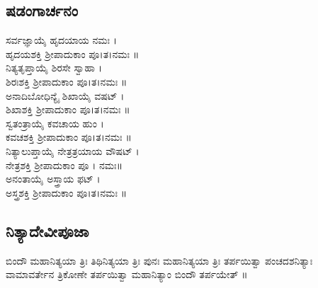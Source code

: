 \subsection{ಷಡಂಗಾರ್ಚನಂ}
 ಸರ್ವಜ್ಞಾಯೈ ಹೃದಯಾಯ ನಮಃ ।\\ ಹೃದಯಶಕ್ತಿ ಶ್ರೀಪಾದುಕಾಂ ಪೂ।ತ।ನಮಃ ॥\\
 ನಿತ್ಯತೃಪ್ತಾಯೈ ಶಿರಸೇ ಸ್ವಾಹಾ ।\\ ಶಿರಃಶಕ್ತಿ ಶ್ರೀಪಾದುಕಾಂ ಪೂ।ತ।ನಮಃ ॥\\
 ಅನಾದಿಬೋಧಿನ್ಯೈ ಶಿಖಾಯೈ ವಷಟ್ ।\\ ಶಿಖಾಶಕ್ತಿ ಶ್ರೀಪಾದುಕಾಂ ಪೂ।ತ।ನಮಃ ॥\\
 ಸ್ವತಂತ್ರಾಯೈ ಕವಚಾಯ ಹುಂ ।\\ ಕವಚಶಕ್ತಿ ಶ್ರೀಪಾದುಕಾಂ ಪೂ।ತ।ನಮಃ ॥\\
 ನಿತ್ಯಾಲುಪ್ತಾಯೈ ನೇತ್ರತ್ರಯಾಯ ವೌಷಟ್ ।\\ ನೇತ್ರಶಕ್ತಿ ಶ್ರೀಪಾದುಕಾಂ ಪೂ । ನಮಃ॥\\
 ಅನಂತಾಯೈ ಅಸ್ತ್ರಾಯ ಫಟ್ ।\\ ಅಸ್ತ್ರಶಕ್ತಿ ಶ್ರೀಪಾದುಕಾಂ ಪೂ।ತ।ನಮಃ ॥
\subsection{ನಿತ್ಯಾದೇವೀಪೂಜಾ}
ಬಿಂದೌ ಮಹಾನಿತ್ಯಯಾ ತ್ರಿಃ ತಿಥಿನಿತ್ಯಯಾ ತ್ರಿಃ ಪುನಃ ಮಹಾನಿತ್ಯಯಾ ತ್ರಿಃ ತರ್ಪಯಿತ್ವಾ ಪಂಚದಶನಿತ್ಯಾಃ ವಾಮಾವರ್ತೇನ ತ್ರಿಕೋಣೇ ತರ್ಪಯಿತ್ವಾ ಮಹಾನಿತ್ಯಾಂ ಬಿಂದೌ ತರ್ಪಯೇತ್ ॥

